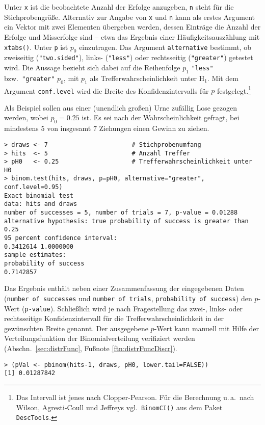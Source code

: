 Unter \lstinline!x! ist die beobachtete Anzahl der Erfolge anzugeben, \lstinline!n! steht für die Stichprobengröße. Alternativ zur Angabe von \lstinline!x! und \lstinline!n! kann als erstes Argument ein Vektor mit zwei Elementen übergeben werden, dessen Einträge die Anzahl der Erfolge und Misserfolge sind -- etwa das Ergebnis einer Häufigkeitsauszählung mit \lstinline!xtabs()!. Unter \lstinline!p! ist $p_{0}$ einzutragen. Das Argument \lstinline!alternative! bestimmt, ob zweiseitig (\lstinline!"two.sided"!), links- (\lstinline!"less"!) oder rechtsseitig (\lstinline!"greater"!) getestet wird. Die Aussage bezieht sich dabei auf die Reihenfolge $p_{1}$ \lstinline!"less"! bzw.\ \lstinline!"greater"! $p_{0}$, mit $p_{1}$ als Trefferwahrscheinlichkeit unter $\text{H}_{1}$. Mit dem Argument \lstinline!conf.level! wird die Breite des Konfidenzintervalls für $p$ festgelegt.\footnote{Das Intervall ist jenes nach Clopper-Pearson. Für die Berechnung u.\,a.\ nach Wilson, Agresti-Coull und Jeffreys vgl.\ \lstinline!BinomCI()! aus dem Paket \lstinline!DescTools!.}

Als Beispiel sollen aus einer (unendlich großen) Urne zufällig Lose gezogen werden, wobei $p_{0} = 0.25$ ist. Es sei nach der Wahrscheinlichkeit gefragt, bei mindestens $5$ von insgesamt $7$ Ziehungen einen Gewinn zu ziehen.
\begin{lstlisting}
> draws <- 7                       # Stichprobenumfang
> hits  <- 5                       # Anzahl Treffer
> pH0   <- 0.25                    # Trefferwahrscheinlichkeit unter H0
> binom.test(hits, draws, p=pH0, alternative="greater", conf.level=0.95)
Exact binomial test
data: hits and draws
number of successes = 5, number of trials = 7, p-value = 0.01288
alternative hypothesis: true probability of success is greater than 0.25
95 percent confidence interval:
0.3412614 1.0000000
sample estimates:
probability of success
0.7142857
\end{lstlisting}

Das Ergebnis enthält neben einer Zusammenfassung der eingegebenen Daten (\lstinline!number of successes! und \lstinline!number of trials!, \lstinline!probability of success!) den $p$-Wert (\lstinline!p-value!). Schließlich wird je nach Fragestellung das zwei-, links- oder rechtsseitige Konfidenzintervall für die Trefferwahrscheinlichkeit in der gewünschten Breite genannt. Der ausgegebene $p$-Wert kann manuell mit Hilfe der Verteilungsfunktion der Binomialverteilung verifiziert werden (Abschn.\ \ref{sec:distrFunc}, Fußnote \ref{ftn:distrFuncDiscr}).
\begin{lstlisting}
> (pVal <- pbinom(hits-1, draws, pH0, lower.tail=FALSE))
[1] 0.01287842
\end{lstlisting}

